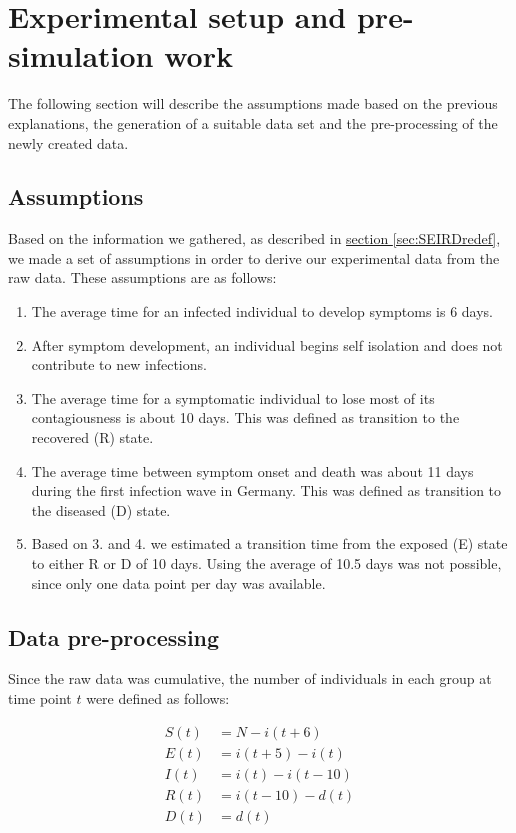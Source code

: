 \section{Experimental setup and pre-simulation work}
The following section will describe the assumptions made based on the previous explanations, the generation of a suitable data set and
the pre-processing of the newly created data.


\subsection{Assumptions}
Based on the information we gathered, as described in \hyperref[sec:SERIDredef]{section \ref*{sec:SEIRDredef}}, we made a set of assumptions
in order to derive our experimental data from the raw data. These assumptions are as follows:

\begin{enumerate}
	\item The average time for an infected individual to develop symptoms is 6 days.
	\item After symptom development, an individual begins self isolation and does not contribute to new infections.
	\item The average time for a symptomatic individual to lose most of its contagiousness is about 10 days. This was defined as
		transition to the recovered (R) state.
	\item The average time between symptom onset and death was about 11 days during the first infection wave in Germany. This was
		defined as transition to the diseased (D) state.
	\item Based on 3. and 4. we estimated a transition time from the exposed (E) state to either R or D of 10 days. Using the
		average of 10.5 days was not possible, since only one data point per day was available.
\end{enumerate}


\subsection{Data pre-processing}
Since the raw data was cumulative, the number of individuals in each group at time point $t$ were defined as follows:

\begin{align}
	S(t) &= N - i(t+6)\\
	E(t) &= i(t+5) - i(t)\\
	I(t) &= i(t) - i(t-10)\\
	R(t) &= i(t-10) - d(t)\\
	D(t) &= d(t)
\end{align}

